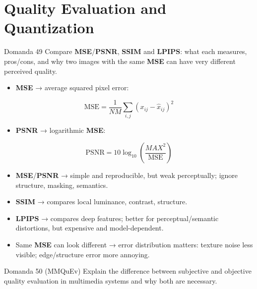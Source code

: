 \section{Quality Evaluation and Quantization}




\begin{questionbox}{Domanda 49}
Compare \textbf{MSE}/\textbf{PSNR}, \textbf{SSIM} and \textbf{LPIPS}: what each measures, pros/cons, and why two images with the same \textbf{MSE} can have very different perceived quality.
\end{questionbox}


\begin{itemize}
  \item \textbf{\textbf{MSE}} → average squared pixel error:
\end{itemize}


$$
\text{MSE}=\frac{1}{NM}\sum_{i,j}(x_{ij}-\hat{x}_{ij})^2
$$


\begin{itemize}
  \item \textbf{\textbf{PSNR}} → logarithmic \textbf{MSE}:
\end{itemize}


$$
\text{PSNR}=10\log_{10}\left(\frac{MAX^2}{\text{MSE}}\right)
$$


\begin{itemize}
  \item \textbf{MSE}/\textbf{PSNR} → simple and reproducible, but weak perceptually; ignore structure, masking, semantics.
  \item \textbf{\textbf{SSIM}} → compares local luminance, contrast, structure.
  \item \textbf{\textbf{LPIPS}} → compares deep features; better for perceptual/semantic distortions, but expensive and model-dependent.
  \item Same \textbf{MSE} can look different → error distribution matters: texture noise less visible; edge/structure error more annoying.
\end{itemize}



\begin{questionbox}{Domanda 50}
(MMQuEv) Explain the difference between subjective and objective quality evaluation in multimedia systems and why both are necessary.
\end{questionbox}


